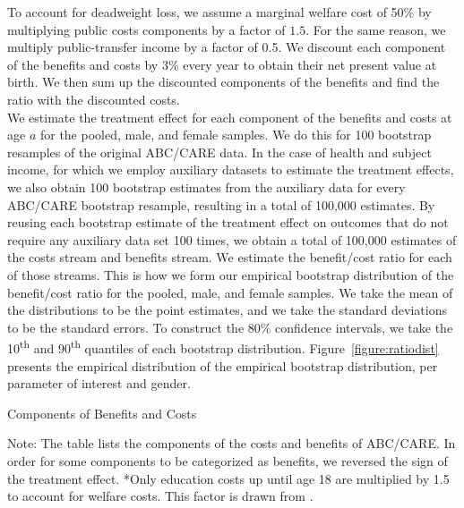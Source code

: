 \noindent To account for deadweight loss, we assume a marginal welfare cost of 50\% by multiplying
public costs components by a factor of $1.5$. For the same reason, we multiply public-transfer
income by a factor of 0.5. We discount each component of the benefits and costs
by 3\% every year to obtain their net present value at birth. We then sum up the discounted
components of the benefits and find the ratio with the discounted costs. \\

\noindent We estimate the treatment effect for each component of the benefits and costs at age $a$ for the pooled, male, and female samples. We do this for 100 bootstrap resamples of the original ABC/CARE data. In the case of health and subject income, for which we employ auxiliary datasets to estimate the treatment effects, we also obtain 100 bootstrap estimates from the auxiliary data for every ABC/CARE bootstrap resample, resulting in a total of 100,000 estimates. By reusing each bootstrap estimate of the treatment effect on outcomes that do not require any auxiliary data set 100 times, we obtain a total of 100,000 estimates of the costs stream and benefits stream. We estimate the benefit/cost ratio for each of those streams. This is how we form our empirical bootstrap distribution of the benefit/cost ratio for the pooled, male, and female samples. We take the mean of the distributions to be the point estimates, and we take the standard deviations to be the standard errors. To construct the 80\% confidence intervals, we take the 10\textsuperscript{th} and 90\textsuperscript{th} quantiles of each bootstrap distribution. Figure~\ref{figure:ratiodist} presents the empirical distribution of the empirical bootstrap distribution, per parameter of interest and gender.

\begin{table}[H]
\begin{threeparttable}
\caption{Components of Benefits and Costs}
\label{table:bc_comp}
\centering

\begin{tablenotes}
\footnotesize
\item Note: The table lists the components of the costs and benefits of ABC/CARE.
In order for some components to be categorized as benefits, we reversed the sign
of the treatment effect. *Only education costs up until age 18 are multiplied by 1.5 to account for welfare costs. This factor is drawn from \citet{Heckman_Moon_etal_2010_RateofReturn}.
\end{tablenotes}
\end{threeparttable}
\end{table}

